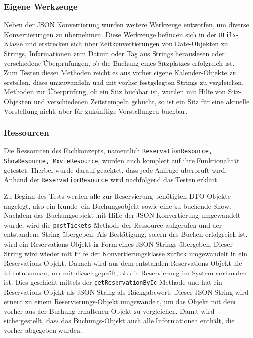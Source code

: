 \subsubsection{Eigene Werkzeuge}

Neben der \acs{JSON} Konvertierung wurden weitere Werkzeuge entworfen, um diverse Konvertierungen zu übernehmen.
Diese Werkzeuge befinden sich in der \texttt{Utils}-Klasse und erstrecken sich über Zeitkonvertierungen von Date-Objekten zu Strings, Informationen zum Datum oder Tag aus Strings herauslesen oder verschiedene Überprüfungen, ob die Buchung eines Sitzplatzes erfolgreich ist.
Zum Testen dieser Methoden reicht es aus vorher eigene Kalender-Objekte zu erstellen, diese umzuwandeln und mit vorher festgelegten Strings zu vergleichen.
Methoden zur Überprüfung, ob ein Sitz buchbar ist, wurden mit Hilfe von Sitz-Objekten und verschiedenen Zeitstempeln gebucht, so ist ein Sitz für eine aktuelle Vorstellung nicht, aber für zukünftige Vorstellungen buchbar.

\subsubsection{Ressourcen}
Die Ressourcen des Fachkonzepts, namentlich \texttt{ReservationResource, ShowResource, MovieResource}, wurden auch komplett auf ihre Funktionalität getestet.
Hierbei wurde darauf geachtet, dass jede Anfrage überprüft wird. Anhand der \texttt{ReservationResource} wird nachfolgend das Testen erklärt.

Zu Beginn des Tests werden alle zur Reservierung benötigten \acs{DTO}-Objekte angelegt, also ein Kunde, ein Buchungsobjekt sowie eine zu buchende Show.
Nachdem das Buchungsobjekt mit Hilfe der JSON Konvertierung umgewandelt wurde, wird die \texttt{postTickets}-Methode der Ressource aufgerufen und der entstandene String übergeben.
Als Bestätigung, sofern das Buchen erfolgreich ist, wird ein Reservations-Objekt in Form eines \acs{JSON}-Strings übergeben. Dieser String wird wieder mit Hilfe der Konvertierungsklasse zurück umgewandelt in ein Reservations-Objekt.
Danach wird aus dem entstanden Reservations-Objekt die Id entnommen, um mit dieser geprüft, ob die Reservierung im System vorhanden ist. Dies geschieht mittels der \texttt{getReservationById}-Methode und hat ein Reservations-Objekt als \acs{JSON}-String als Rückgabewert.
Dieser \acs{JSON}-String wird erneut zu einem Reservierungs-Objekt umgewandelt, um das Objekt mit dem vorher aus der Buchung erhaltenen Objekt zu vergleichen. Damit wird sichergestellt, dass das Buchungs-Objekt auch alle Informationen enthält, die vorher abgegeben wurden.

